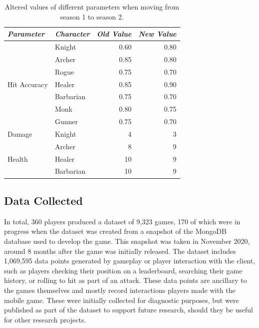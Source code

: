 \begin{table}[h]
  \centering
  \begin{tabular}{@{}l l r r@{}@{}}
    \toprule
    \emph{Parameter} & \emph{Character} & \emph{Old Value} & \emph{New Value} \\
    \midrule
    \multirow{7}{*}{Hit Accuracy} & Knight    & 0.60 & 0.80 \\
                                  & Archer    & 0.85 & 0.80 \\
                                  & Rogue     & 0.75 & 0.70 \\
                                  & Healer    & 0.85 & 0.90 \\
                                  & Barbarian & 0.75 & 0.70 \\
                                  & Monk      & 0.80 & 0.75 \\
                                  & Gunner    & 0.75 & 0.70 \\
    \midrule
    \multirow{1}{*}{Damage}       & Knight    & 4    & 3    \\
    \midrule
    \multirow{3}{*}{Health}       & Archer    & 8    & 9    \\
                                  & Healer    & 10   & 9    \\
                                  & Barbarian & 10   & 9    \\
    \bottomrule
  \end{tabular}
  \caption{Altered values of different parameters when moving from season 1 to season 2.}
  \label{fig:changes_between_seasons}
\end{table}


\subsection{Data Collected}
\label{sec:rpglite_data_discussed}

In total, 360 players produced a dataset of 9,323 games, 170 of which were in
progress when the dataset was created from a snapshot of the MongoDB database
used to develop the game. This snapshot was taken in November 2020, around 8
months after the game was initially released. The dataset includes 1,069,595
data points generated by gameplay or player interaction with the client, such as
players checking their position on a leaderboard, searching their game history,
or rolling to hit as part of an attack. These data points are ancillary to the
games themselves and mostly record interactions players made with the mobile
game. These were initially collected for diagnostic purposes, but were published
as part of the dataset to support future research, should they be useful for
other research projects.

